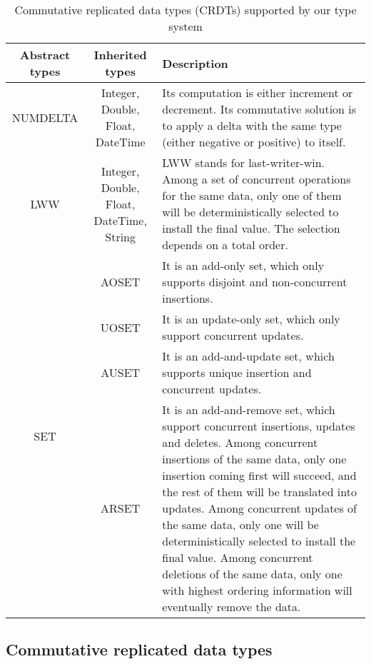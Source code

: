
\begin{table*}[!t]
\centering
\begin{tabular}{|c|c|p{8cm}|}
\hline
Abstract types & Inherited types & Description \\
\hline
NUMDELTA & Integer, Double, Float, DateTime & 
  Its computation is either increment or decrement. Its commutative solution 
  is to apply a delta with the same type (either negative or positive) to itself.  \\ \hline
LWW & Integer, Double, Float, DateTime, String & 
  LWW stands for last-writer-win. Among a set of concurrent operations 
  for the same data, only one of them will be deterministically selected 
  to install the final value. The selection depends on a total order.\\ \hline
\multirow{4}{*}{SET} & AOSET & It is an add-only set, which only supports disjoint and non-concurrent
	  insertions.\\
 \cline{2-3} 
&  UOSET & It is an update-only set, which only support concurrent updates.\\
 \cline{2-3} 
&  AUSET & It is an add-and-update set, which supports unique insertion and concurrent updates.\\ 
 \cline{2-3} 
&  ARSET & It is an add-and-remove set, which support concurrent insertions, updates
	    and deletes. Among concurrent insertions of the same data, only one insertion coming first will
	    succeed, and the rest of them will be translated into updates. Among concurrent updates of the same
	    data, only one will be deterministically selected to install the final value. Among concurrent
	    deletions of the same data, only one with highest ordering information will eventually remove the 
	    data.\\
\hline
\end{tabular}
\caption{Commutative replicated data types (CRDTs) supported by our type system}
\label{tab:crdts}
\end{table*}
  

\subsection{Commutative replicated data types}

